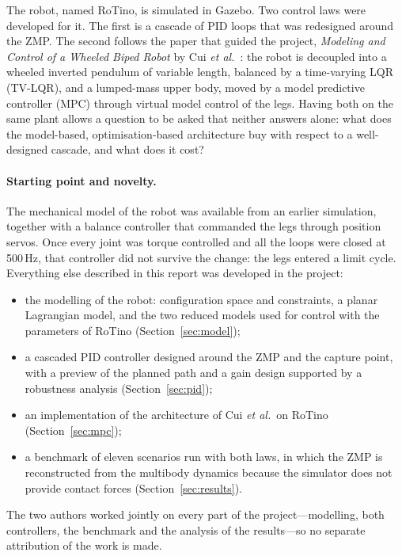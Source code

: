 \documentclass[11pt,a4paper]{article}
\begin{document}
The robot, named RoTino, is simulated in Gazebo. Two control laws were developed for
it. The first is a cascade of PID loops that was redesigned around the ZMP. The second follows the paper that
guided the project, \emph{Modeling and Control of a Wheeled Biped Robot} by Cui \emph{et al.}~\cite{cui2022}: the
robot is decoupled into a wheeled inverted pendulum of variable length, balanced by a time-varying LQR (TV-LQR),
and a lumped-mass upper body, moved by a model predictive controller (MPC) through virtual model control of the
legs. Having both on the same plant allows a question to be asked that neither answers alone: what does the
model-based, optimisation-based architecture buy with respect to a well-designed cascade, and what does it cost?

\paragraph{Starting point and novelty.} The mechanical model of the robot was available from an earlier simulation,
together with a balance controller that commanded the legs through position servos. Once every joint was
torque controlled and all the loops were closed at 500\,Hz, that controller did not survive the change: the legs
entered a limit cycle. Everything else described in this report was developed in the project:

\begin{itemize}
  \item the modelling of the robot: configuration space and constraints, a planar Lagrangian model, and the two
        reduced models used for control with the parameters of RoTino (Section~\ref{sec:model});
  \item a cascaded PID controller designed around the ZMP and the capture point, with a preview of the planned path
        and a gain design supported by a robustness analysis (Section~\ref{sec:pid});
  \item an implementation of the architecture of Cui \emph{et al.}\ on RoTino (Section~\ref{sec:mpc});
  \item a benchmark of eleven scenarios run with both laws, in which the ZMP is reconstructed from the multibody
        dynamics because the simulator does not provide contact forces (Section~\ref{sec:results}).
\end{itemize}

The two authors worked jointly on every part of the project---modelling, both controllers, the benchmark and the
analysis of the results---so no separate attribution of the work is made.
\end{document}
